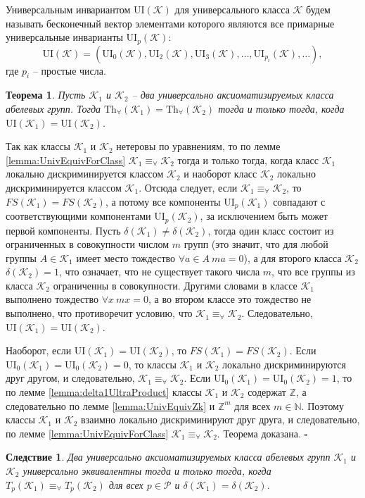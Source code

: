 \documentclass[a4paper,11pt,twoside]{article}
\newtheorem{theorem}{Теорема}[section]
\newtheorem{corollary}{Следствие}[section]
\def\proof{{\noindent{\bf Доказательство.}} }
\def\K{{\mathcal{K}}}
\def\P{{\mathcal{P}}}
\def\Z{{\mathbb{Z}}}
\def\N{{\mathbb{N}}}
\def\Tha{{\mathrm{Th}_\forall}}
\def\ui{{\mathrm{UI}}}
\begin{document}
Универсальным инвариантом $\ui(\K)$ для универсального класса $\K$ будем называть бесконечный вектор элементами которого являются все примарные универсальные инварианты $\ui_p(\K)$:
$$\ui(\K) = (\ui_0(\K), \ui_2(\K), \ui_3(\K), \ldots, \ui_{p_i}(\K), \ldots ),$$
где $p_i$ -- простые числа.

\begin{theorem}\label{th:UnivClasses}
Пусть $\K_1$ и $\K_2$ -- два универсально аксиоматизируемых класса абелевых групп. Тогда $\Tha(\K_1) = \Tha(\K_2)$ тогда и только тогда, когда $\ui(\K_1) = \ui(\K_2)$.
\end{theorem}
\proof Так как классы $\K_1$ и $\K_2$ нетеровы по уравнениям, то по лемме \ref{lemma:UnivEquivForClass} $\K_1 \equiv_\forall \K_2$ тогда и только тогда, когда класс $\K_1$ локально дискриминируется классом $\K_2$ и наоборот класс $\K_2$ локально дискриминируется классом $\K_1$. Отсюда следует, если $\K_1 \equiv_\forall \K_2$, то $FS(\K_1) = FS(\K_2)$, а потому все компоненты $\ui_p(\K_1)$ совпадают с соответствующими компонентами $\ui_p(\K_2)$, за исключением быть может первой компоненты. Пусть $\delta(\K_1) \neq \delta(\K_2)$, тогда один класс состоит из ограниченных в совокупности числом $m$ групп (это значит, что для любой группы $A \in \K_1$ имеет место тождество $\forall a \in A \ ma = 0$), а для второго класса $\K_2$ $\delta(\K_2) = 1$, что означает, что не существует такого числа $m$, что все группы из класса $\K_2$ ограниченны в совокупности. Другими словами в классе $\K_1$ выполнено тождество $\forall x \ mx = 0$, а во втором классе это тождество не выполнено, что противоречит условию, что $\K_1 \equiv_\forall \K_2$. Следовательно, $\ui(\K_1) = \ui(\K_2)$.

Наоборот, если $\ui(\K_1) = \ui(\K_2)$, то $FS(\K_1) = FS(\K_2)$. Если $\ui_0(\K_1) = \ui_0(\K_2) = 0$, то классы $\K_1$ и $\K_2$ локально дискриминируются друг другом, и следовательно, $\K_1 \equiv_\forall \K_2$. Если $\ui_0(\K_1) = \ui_0(\K_2) = 1$, то по лемме \ref{lemma:delta1UltraProduct} классы $\K_1$ и $\K_2$ содержат $\Z$, а следовательно по лемме \ref{lemma:UnivEquivZk} и $\Z^m$ для всех $m \in \N$. Поэтому классы $\K_1$ и $\K_2$ взаимно локально дискриминируют друг друга, и следовательно, по лемме \ref{lemma:UnivEquivForClass} $\K_1 \equiv_\forall \K_2$. Теорема доказана. $\square$

\begin{corollary}
Два универсально аксиоматизируемых класса абелевых групп $\K_1$ и $\K_2$ универсально эквивалентны тогда и только тогда, когда $T_p(\K_1) \equiv_\forall T_p(\K_2)$ для всех $p \in \P$ и $\delta(\K_1) = \delta(\K_2).$
\end{corollary}
\end{document}
